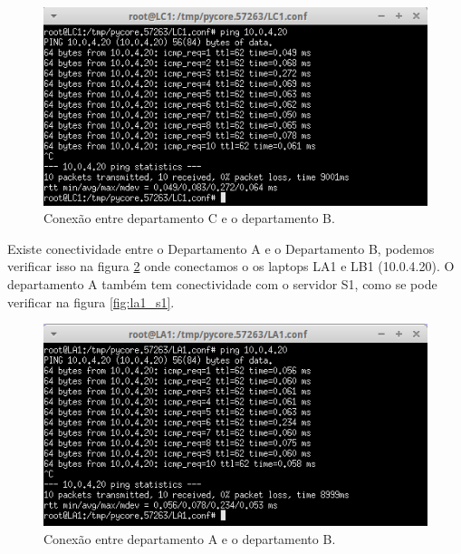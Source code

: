 \documentclass{llncs}
\begin{document}
\begin{figure}[H]
\begin{center}
\includegraphics[scale=0.50]{LC1_LB1.png} 
\end{center}
\caption{\label{fig:lc1_lb1} Conexão entre departamento C e o departamento B.}
\end{figure} 

Existe conectividade entre o Departamento A e o Departamento B, podemos verificar isso na figura \ref{fig:la1_lb1} onde conectamos o os laptops LA1 e LB1 (10.0.4.20). O departamento A também tem conectividade com o servidor S1, como se pode verificar na figura \ref{fig:la1_s1}.

\begin{figure}[H]
\begin{center}
\includegraphics[scale=0.50]{LA1_LB1.png} 
\end{center}
\caption{\label{fig:la1_lb1} Conexão entre departamento A e o departamento B.}
\end{figure} 
\end{document}
